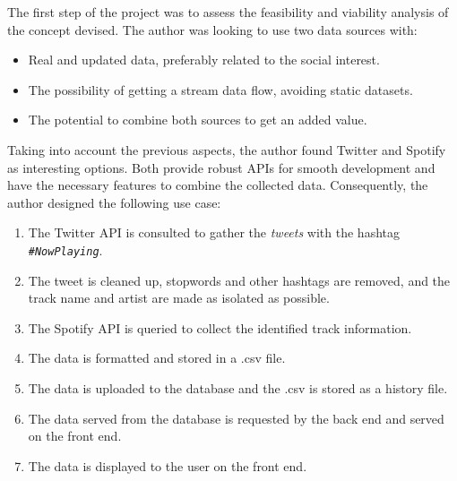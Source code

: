 

\nonzeroparskip The first step of the project was to assess the feasibility and viability analysis of the concept devised. The author was looking to use two data sources with:

\begin{itemize}
	\item Real and updated data, preferably related to the social interest.
	\item The possibility of getting a stream data flow, avoiding static datasets.
	\item The potential to combine both sources to get an added value.
\end{itemize}

\nonzeroparskip Taking into account the previous aspects, the author found Twitter and Spotify as interesting options. Both provide robust APIs for smooth development and have the necessary features to combine the collected data. Consequently, the author designed the following use case:

\begin{enumerate}
	\item The Twitter API is consulted to gather the \textit{tweets} with the hashtag \texttt{\textit{\#NowPlaying}}.
	\item The tweet is cleaned up, stopwords and other hashtags are removed, and the track name and artist are made as isolated as possible.
	\item The Spotify API is queried to collect the identified track information.
	\item The data is formatted and stored in a .csv file.
	\item The data is uploaded to the database and the .csv is stored as a history file.
	\item The data served from the database is requested by the back end and served on the front end.
	\item The data is displayed to the user on the front end.
\end{enumerate}

